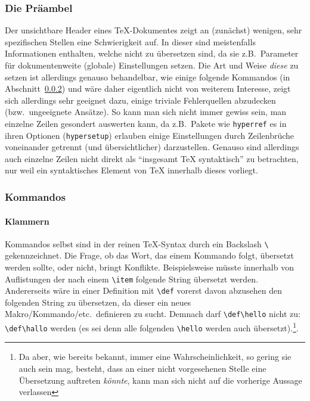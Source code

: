 \subsubsection{Die Präambel}
Der unsichtbare Header eines \TeX{}-Dokumentes zeigt an (zunächst) wenigen, sehr spezifischen Stellen eine Schwierigkeit auf. In dieser sind meistenfalls Informationen enthalten, welche nicht zu übersetzen sind, da sie z.B.\ Parameter für dokumentenweite (globale) Einstellungen setzen. Die Art und Weise \textit{diese} zu setzen ist allerdings genauso behandelbar, wie einige folgende Kommandos (in Abschnitt~\ref{}) und wäre daher eigentlich nicht von weiterem Interesse, zeigt sich allerdings sehr geeignet dazu, einige triviale Fehlerquellen abzudecken (bzw.\ ungeeignete Ansätze). So kann man sich nicht immer gewiss sein, man einzelne Zeilen gesondert auswerten kann, da z.B.\ Pakete wie \texttt{hyperref} es in ihren Optionen (\texttt{hypersetup}) erlauben einige Einstellungen durch Zeilenbrüche voneinander getrennt (und übersichtlicher) darzustellen.%
Genauso sind allerdings auch einzelne Zeilen nicht direkt als \enquote{insgesamt \TeX{} syntaktisch} zu betrachten, nur weil ein syntaktisches Element von \TeX{} innerhalb dieses vorliegt.%


\subsubsection{Kommandos}
\paragraph*{Klammern}
Kommandos selbst sind in der reinen \TeX{}-Syntax durch ein Backslash \verb|\| gekennzeichnet. Die Frage, ob das Wort, das einem Kommando folgt, übersetzt werden sollte, oder nicht, bringt Konflikte. Beispielsweise müsste innerhalb von Auflistungen der nach einem \verb|\item| folgende String übersetzt werden. Andererseits wäre in einer Definition mit \verb|\def| vorerst davon abzusehen den folgenden String zu übersetzen, da dieser ein neues Makro/Kommando/etc.\ definieren zu sucht. Demnach darf \verb|\def\hello| nicht zu: \verb|\def\hallo| werden (es sei denn alle folgenden \verb|\hello| werden auch übersetzt).\footnote{Da aber, wie bereits bekannt, immer eine Wahrscheinlichkeit, so gering sie auch sein mag, besteht, dass an einer nicht vorgesehenen Stelle eine Übersetzung auftreten \textit{könnte}, kann man sich nicht auf die vorherige Aussage verlassen}.


